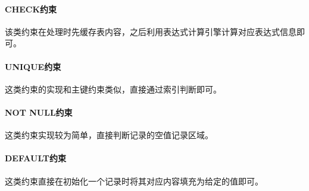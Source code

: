 \documentclass[10pt]{article}
\begin{document}
\paragraph{CHECK约束} 该类约束在处理时先缓存表内容，之后利用表达式计算引擎计算对应表达式信息即可。
\paragraph{UNIQUE约束} 这类约束的实现和主键约束类似，直接通过索引判断即可。
\paragraph{NOT NULL约束} 这类约束实现较为简单，直接判断记录的空值记录区域。
\paragraph{DEFAULT约束} 这类约束直接在初始化一个记录时将其对应内容填充为给定的值即可。
\end{document}
